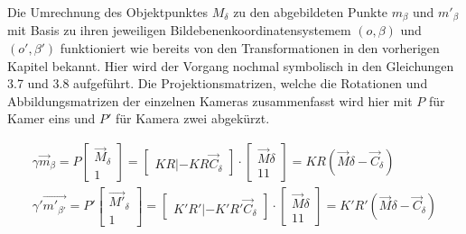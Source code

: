 Die Umrechnung des Objektpunktes $M_\delta$ zu den abgebildeten Punkte $m_\beta$ und $m'_\beta$ mit Basis zu ihren jeweiligen Bildebenenkoordinatensystemem $(o, \beta)$ und $(o',\beta')$ funktioniert wie bereits von den Transformationen in den vorherigen Kapitel bekannt. Hier wird der Vorgang nochmal symbolisch in den Gleichungen 3.7 und 3.8 aufgeführt. Die Projektionsmatrizen, welche die Rotationen und Abbildungsmatrizen der einzelnen Kameras zusammenfasst wird hier mit $P$ für Kamer eins  und $P'$ für Kamera zwei abgekürzt.\cite{Elements}

\begin{gather}
\gamma \vec{m}_\beta = P \begin{bmatrix}\vec{M}_\delta\\1\end{bmatrix} = 
\begin{bmatrix}KR|-KR\vec{C}_\delta\end{bmatrix}\cdot \begin{bmatrix}\vec{M}\delta\\11\end{bmatrix} = KR(\vec{M}\delta - \vec{C}_\delta)\\
\gamma' \vec{m'_{\beta'}} = P' \begin{bmatrix}\vec{M'}_\delta\\1\end{bmatrix} = 
\begin{bmatrix}K'R'|-K'R'\vec{C}_\delta\end{bmatrix}\cdot \begin{bmatrix}\vec{M}\delta\\11\end{bmatrix} = K'R'(\vec{M}\delta - \vec{C}_\delta)
\end{gather}
